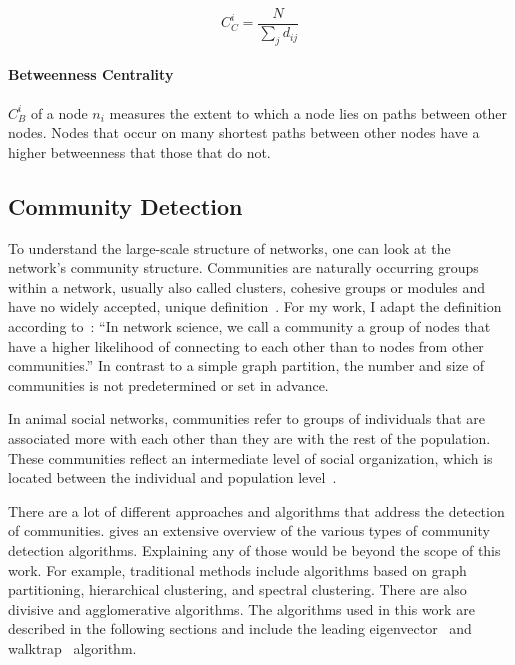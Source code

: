 $$C_C^i=\frac{N}{\sum_{j}d_{ij}}$$

\paragraph{Betweenness Centrality}
$C^i_B$ of a node $n_i$ measures the extent to which a node lies on paths between other nodes. Nodes that occur on many shortest paths between other nodes have a higher betweenness that those that do not.


\subsection{Community Detection}
\label{subsec:bg:communities}
To understand the large-scale structure of networks, one can look at the network's community structure. Communities are naturally occurring groups within a network, usually also called clusters, cohesive groups or modules and have no widely accepted, unique definition~\cite{palla2005uncovering}.
For my work, I adapt the definition according to~\textcite[p. 322]{barabasi2016network}: 
``In network science, we call a community a group of nodes that have a higher likelihood of connecting to each other than to nodes from other communities.'' In contrast to a simple graph partition, the number and size of communities is not predetermined or set in advance.

In animal social networks, communities refer to groups of individuals that are associated more with each other than they are with the rest of the population. These communities reflect an intermediate level of social organization, which is located between the individual and population level~\cite{croft2008exploring}.

There are a lot of different approaches and algorithms that address the detection of communities. \textcite{fortunato2010community} gives an extensive overview of the various types of community detection algorithms.
Explaining any of those would be beyond the scope of this work. For example, traditional methods include algorithms based on graph partitioning, hierarchical clustering, and spectral clustering. There are also divisive and agglomerative algorithms.
The algorithms used in this work are described in the following sections and include the leading eigenvector~\cite{newman2006finding} and walktrap~\cite{pons2005computing} algorithm.

